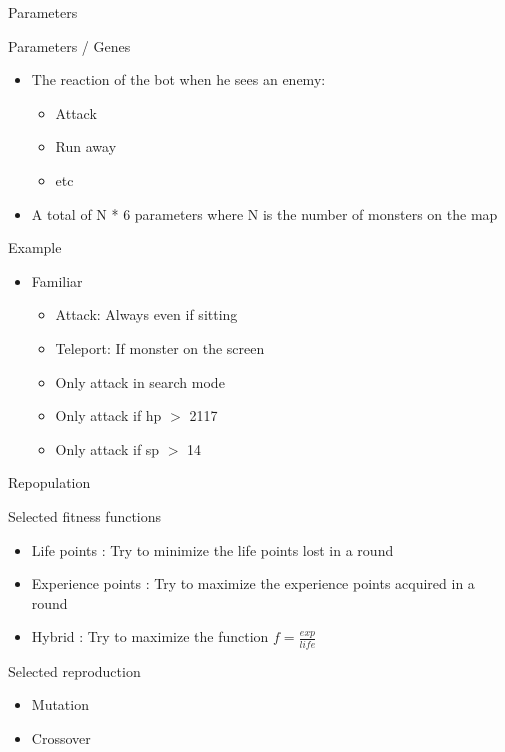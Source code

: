 \begin{frame}{Parameters}

  \begin{block}{Parameters / Genes}
    \begin{itemize}
    \item The reaction of the bot when he sees an enemy:
      \begin{itemize}
      \item Attack
      \item Run away
      \item etc
      \end{itemize}
    \item A total of N * 6 parameters where N is the number of monsters on the map
    \end{itemize}
  \end{block}

  \begin{block}{Example}
    \begin{itemize}
		\item Familiar
		\begin{itemize}
			\item Attack: Always even if sitting
			\item Teleport: If monster on the screen
			\item Only attack in search mode
			\item Only attack if hp $>$ 2117
			\item Only attack if sp $>$ 14
		\end{itemize}
	\end{itemize}
  \end{block}

\end{frame}

\begin{frame}{Repopulation}
  \begin{block}{Selected fitness functions}
    \begin{itemize}
    \item Life points : Try to minimize the life points lost in a round
    \item Experience points : Try to maximize the experience points acquired in a round
    \item Hybrid : Try to maximize the function $f = \frac{exp}{life} $
    \end{itemize}
  \end{block}

  \begin{block}{Selected reproduction}
    \begin{itemize}
    \item Mutation
    \item Crossover
    \end{itemize}
  \end{block}
\end{frame}

